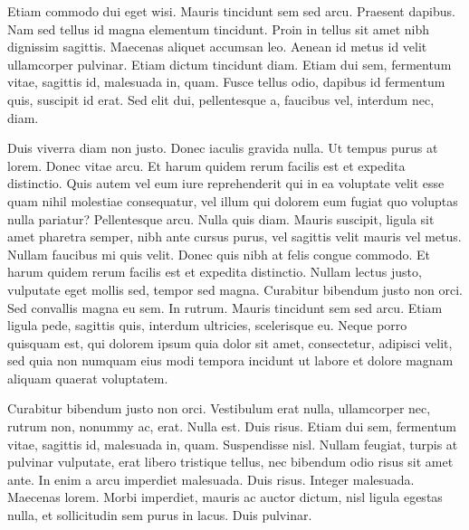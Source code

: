 Etiam commodo dui eget wisi. Mauris tincidunt sem sed arcu. Praesent dapibus. Nam sed tellus id magna elementum tincidunt. Proin in tellus sit amet nibh dignissim sagittis. Maecenas aliquet accumsan leo. Aenean id metus id velit ullamcorper pulvinar. Etiam dictum tincidunt diam. Etiam dui sem, fermentum vitae, sagittis id, malesuada in, quam. Fusce tellus odio, dapibus id fermentum quis, suscipit id erat. Sed elit dui, pellentesque a, faucibus vel, interdum nec, diam.

Duis viverra diam non justo. Donec iaculis gravida nulla. Ut tempus purus at lorem. Donec vitae arcu. Et harum quidem rerum facilis est et expedita distinctio. Quis autem vel eum iure reprehenderit qui in ea voluptate velit esse quam nihil molestiae consequatur, vel illum qui dolorem eum fugiat quo voluptas nulla pariatur? Pellentesque arcu. Nulla quis diam. Mauris suscipit, ligula sit amet pharetra semper, nibh ante cursus purus, vel sagittis velit mauris vel metus. Nullam faucibus mi quis velit. Donec quis nibh at felis congue commodo. Et harum quidem rerum facilis est et expedita distinctio. Nullam lectus justo, vulputate eget mollis sed, tempor sed magna. Curabitur bibendum justo non orci. Sed convallis magna eu sem. In rutrum. Mauris tincidunt sem sed arcu. Etiam ligula pede, sagittis quis, interdum ultricies, scelerisque eu. Neque porro quisquam est, qui dolorem ipsum quia dolor sit amet, consectetur, adipisci velit, sed quia non numquam eius modi tempora incidunt ut labore et dolore magnam aliquam quaerat voluptatem.

Curabitur bibendum justo non orci. Vestibulum erat nulla, ullamcorper nec, rutrum non, nonummy ac, erat. Nulla est. Duis risus. Etiam dui sem, fermentum vitae, sagittis id, malesuada in, quam. Suspendisse nisl. Nullam feugiat, turpis at pulvinar vulputate, erat libero tristique tellus, nec bibendum odio risus sit amet ante. In enim a arcu imperdiet malesuada. Duis risus. Integer malesuada. Maecenas lorem. Morbi imperdiet, mauris ac auctor dictum, nisl ligula egestas nulla, et sollicitudin sem purus in lacus. Duis pulvinar.

